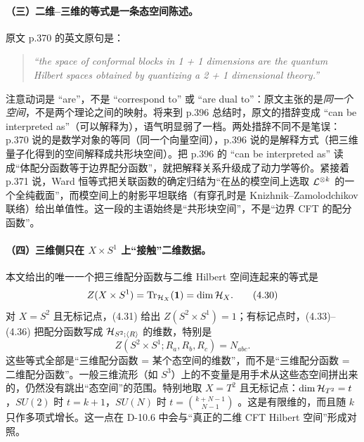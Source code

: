 \paragraph{（三）二维--三维的等式是一条态空间陈述。}
原文 p.370 的英文原句是：
\begin{quote}
\emph{“the space of conformal blocks in 1 + 1 dimensions are the quantum Hilbert spaces obtained by quantizing a 2 + 1 dimensional theory.”}
\end{quote}
 注意动词是 “are”，不是 “correspond to” 或 “are dual to”：原文主张的是\emph{同一个空间}，不是两个理论之间的映射。将来到 p.396 总结时，原文的措辞变成 “can be interpreted as”（可以解释为），语气明显弱了一档。两处措辞不同不是笔误：p.370 说的是数学对象的等同（同一个向量空间），p.396 说的是解释方式（把三维量子化得到的空间解释成共形块空间）。把 p.396 的 “can be interpreted as” 读成“体配分函数等于边界配分函数”，就把解释关系升级成了动力学等价。紧接着 p.371 说，Ward 恒等式把关联函数的确定归结为“在丛的模空间上选取 $\mathcal{L}^{\otimes k}$ 的一个全纯截面”，而模空间上的射影平坦联络（有穿孔时是 Knizhnik--Zamolodchikov 联络）给出单值性。这一段的主语始终是“共形块空间”，不是“边界 CFT 的配分函数”。

\paragraph{（四）三维侧只在 $X\times S^1$ 上“接触”二维数据。}
本文给出的唯一一个把三维配分函数与二维 Hilbert 空间连起来的等式是
\begin{equation}
Z(X\times S^1)=\operatorname{Tr}_{\mathcal{H}_X}(\mathbf 1)=\dim\mathcal{H}_X . \tag{4.30}
\end{equation}
 对 $X=S^2$ 且无标记点，(4.31) 给出 $Z(S^2\times S^1)=1$；有标记点时，(4.33)--(4.36) 把配分函数写成 $\mathcal{H}_{S^2;\langle R\rangle}$ 的维数，特别是
\begin{equation}
Z(S^2\times S^1;R_a,R_b,R_c)=N_{abc}. \tag{4.36}
\end{equation}
 这些等式全部是“三维配分函数 = 某个态空间的维数”，而不是“三维配分函数 = 二维配分函数”。一般三维流形（如 $S^3$）上的不变量是用手术从这些态空间拼出来的，仍然没有跳出“态空间”的范围。特别地取 $X=T^2$ 且无标记点：$\dim\mathcal{H}_{T^2}=t$，$SU(2)$ 时 $t=k+1$，$SU(N)$ 时 $t=\binom{k+N-1}{N-1}$ 。这是有限维的，而且随 $k$ 只作多项式增长。这一点在 D-10.6 中会与“真正的二维 CFT Hilbert 空间”形成对照。

